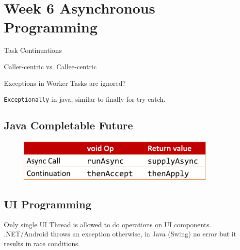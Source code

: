 \section{Week 6 Asynchronous Programming}

Task Continuations

Caller-centric vs. Callee-centric

Exceptions in Worker Tasks are ignored?

\verb|Exceptionally| in java, similar to finally for try-catch.

\subsection*{Java Completable Future}

\begin{figure}[H]
    \centering
    \includegraphics[width=10cm]{res/completable-future.png}
\end{figure}

\subsection{UI Programming}

Only single UI Thread is allowed to do operations on UI components. .NET/Android throws an exception otherwise, in Java (Swing) no error but it results in race conditions.


